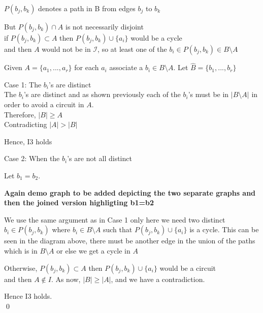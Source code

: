 \documentclass[../main.tex]{subfiles}
\begin{document}
 \vspace{2mm}
 
 \noindent\Notation $ P ( b_j, b_k ) $ denotes a path in B from edges $ b_j $ to $ b_k $
 
 \vspace{2mm}
 
\noindent But $ P(b_j,b_k) \cap A $ is not necessarily disjoint\\
\noindent if $ P(b_j,b_k) \subset A  $ then $ P(b_j,b_k) \cup \{ a_i \} $  would be a cycle\\ and then $ A$ would not be in $ \mathcal{I} $, so at least one of the $ b_i \in P(b_j,b_k) \in B \setminus A $
 
 \vspace{4mm}
 
 \noindent Given $A = \{a_1, ... ,a_r\} $ for each $a_i$ associate a $b_i \in B \setminus A$. Let $\hat{B} = \{b_1, ... ,b_r\}$
 
 \vspace{2mm}
 
 \noindent Case 1: The $ b_i$'s are distinct\\
 The $ b_i$'s are distinct and as shown previously each of the $ b_i$'s must be in $ |B \setminus A| $ in order to avoid a circuit in $ A $.\\ 
\noindent Therefore,
  $ |B| \geqslant A $ \\Contradicting $ |A|  >  |B| $
 
 \vspace{3mm}
 
\noindent Hence, I3 holds

\noindent Case 2: When the $b_i$'s are not all distinct

\noindent Let $ b_1 = b_2 $.

\textbf{Again demo graph to be added depicting the two separate graphs and then the joined version highligting b1=b2}

\noindent We use the same argument as in Case 1 only here we need two distinct $ b_i \in P( b_j, b_k) $ where $ b_i \in B \setminus A $ such that  $ P(b_j , b_k ) \cup \{ a_i \} $ is a cycle. This can be seen in the diagram above, there must be another edge in the union of the paths which is in $ B \setminus A$ or else we get a cycle in $A$

\vspace{2mm}

\noindent Otherwise, $ P(b_j,b_k) \subset A  $ then $ P(b_j,b_k) \cup \{ a_i \} $  would be a circuit\\ and then $ A \notin I $. As now, $ |B| \geq |A| $, and we have a contradiction.

\noindent Hence I3 holds.\\
\qed

 
 
\end{document}

